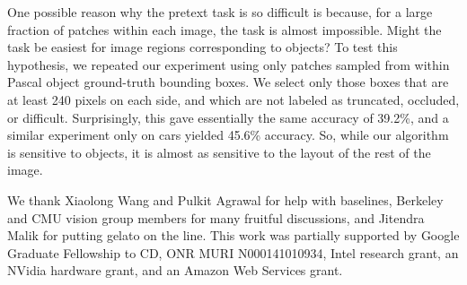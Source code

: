 \documentclass[10pt,twocolumn,letterpaper]{article}
\begin{document}
One possible reason why the pretext task is so difficult is because, for a large fraction of patches within each image, the task is almost impossible.  Might the task be easiest for image regions corresponding to objects? To test this hypothesis, we repeated our experiment using only patches sampled from within Pascal object ground-truth bounding boxes.  We select only those boxes that are at least 240 pixels on each side, and which are not labeled as truncated, occluded, or difficult.  Surprisingly, this gave essentially the same accuracy of 39.2\%, %
and a similar experiment only on cars yielded 45.6\% accuracy.   So, while our algorithm is sensitive to objects, it is almost as sensitive to the layout of the rest of the image.  


\footnotesize {} We thank Xiaolong Wang and Pulkit Agrawal for help with baselines,
Berkeley and CMU vision group members for many fruitful discussions, and Jitendra Malik for putting gelato on the line. This work was partially supported by Google Graduate Fellowship to CD, ONR MURI N000141010934, Intel research grant, an NVidia hardware grant, and an Amazon Web Services grant.





{\footnotesize


}
\end{document}
